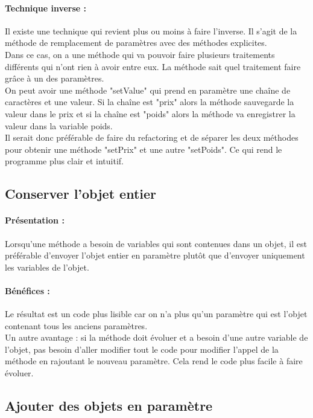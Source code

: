 \documentclass[a4paper,twoside,12pt,openright]{report}
\begin{document}
\paragraph{Technique inverse :}
Il existe une technique qui revient plus ou moins à faire l'inverse. Il s'agit de la méthode de remplacement de paramètres avec des méthodes explicites.\\
Dans ce cas, on a une méthode qui va pouvoir faire plusieurs traitements différents qui n'ont rien à avoir entre eux. La méthode sait quel traitement faire grâce à un des paramètres.\\
On peut avoir une méthode "setValue" qui prend en paramètre une chaîne de caractères et une valeur. Si la chaîne est "prix" alors la méthode sauvegarde la valeur dans le prix et si la chaîne est "poids" alors la méthode va enregistrer la valeur dans la variable poids.\\
Il serait donc préférable de faire du refactoring et de séparer les deux méthodes pour obtenir une méthode "setPrix" et une autre "setPoids". Ce qui rend le programme plus clair et intuitif.\\

\subsection{Conserver l'objet entier}
\paragraph{Présentation :}
Lorsqu'une méthode a besoin de variables qui sont contenues dans un objet, il est préférable d'envoyer l'objet entier en paramètre plutôt que d'envoyer uniquement les variables de l'objet.

\paragraph{Bénéfices :}
Le résultat est un code plus lisible car on n'a plus qu'un paramètre qui est l'objet contenant tous les anciens paramètres.\\
Un autre avantage : si la méthode doit évoluer et a besoin d'une autre variable de l'objet, pas besoin d'aller modifier tout le code pour modifier l'appel de la méthode en rajoutant le nouveau paramètre. Cela rend le code plus facile à faire évoluer.\\

\subsection{Ajouter des objets en paramètre}
\end{document}
